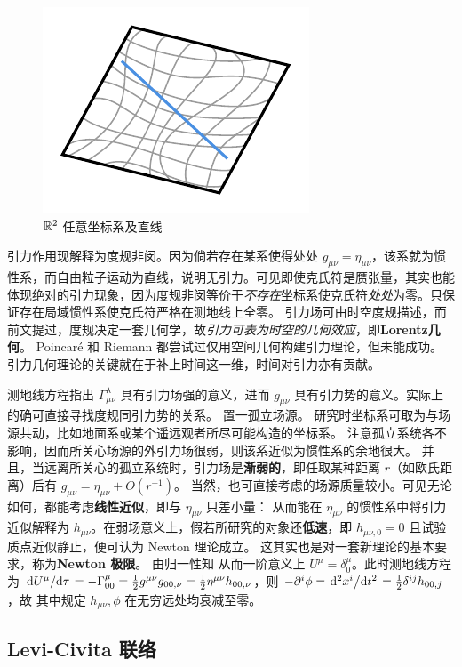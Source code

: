\begin{figure}[ht]
    \centering
\includegraphics[width=.4\textwidth]{fig/chpt01/geodesic.pdf}
    \caption{ $\mathbb{R}^2$ 任意坐标系及直线}
\end{figure}

引力作用现解释为度规非闵。因为倘若存在某系使得处处 $g_{\mu\nu}=\eta_{\mu\nu}$，该系就为惯性系，而自由粒子运动为直线，说明无引力。可见即使克氏符是赝张量，其实也能体现绝对的引力现象，因为度规非闵等价于\textit{不存在}坐标系使克氏符\textit{处处}为零。只保证存在局域惯性系使克氏符严格在测地线上全零。
引力场可由时空度规描述，而前文提过，度规决定一套几何学，故\textit{引力可表为时空的几何效应}，即\textbf{Lorentz几何}。
Poincaré 和 Riemann 都尝试过仅用空间几何构建引力理论，但未能成功。引力几何理论的关键就在于补上时间这一维，时间对引力亦有贡献。

测地线方程指出 $\Gamma^{\lambda}_{\mu\nu}$ 具有引力场强的意义，进而 $g_{\mu\nu}$ 具有引力势的意义。实际上的确可直接寻找度规同引力势的关系。
置一孤立场源。
研究时坐标系可取为与场源共动，比如地面系或某个遥远观者所尽可能构造的坐标系。
注意孤立系统各不影响，因而所关心场源的外引力场很弱，则该系近似为惯性系的余地很大。
并且，当远离所关心的孤立系统时，引力场是\textbf{渐弱的}，即任取某种距离 $r$（如欧氏距离）后有 $g_{\mu\nu}=\eta_{\mu\nu}+O(r^{-1})$。
当然，也可直接考虑的场源质量较小。可见无论如何，都能考虑\textbf{线性近似}，即与 $\eta_{\mu\nu}$ 只差小量：
从而能在 $\eta_{\mu\nu}$ 的惯性系中将引力近似解释为 $h_{\mu\nu}$。在弱场意义上，假若所研究的对象还\textbf{低速}，即 $h_{\mu\nu,0}=0$ 且试验质点近似静止，便可认为 Newton 理论成立。
这其实也是对一套新理论的基本要求，称为\textbf{Newton 极限}。
由归一性知
从而一阶意义上 $U^\mu=\delta^\mu_0$。此时测地线方程为 $\dv*{U^\mu}{\tau}=-\Gamma_{00}^\mu= \frac 12 g^{\mu\nu} g_{00,\nu}=\frac 12 \eta^{\mu\nu} h_{00,\nu}$，则 $-\partial^i\phi=\dv*[2]{x^i}{t}=\frac 12 \delta^{ij} h_{00,j}$，故
其中规定 $h_{\mu\nu},\phi$ 在无穷远处均衰减至零。


\subsection{Levi-Civita 联络}\label{sec:co-di}

